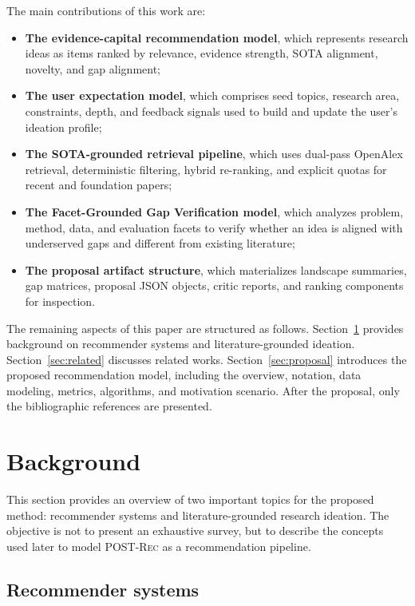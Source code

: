 \documentclass[preprint,12pt]{elsarticle}
\begin{document}
The main contributions of this work are:
\begin{itemize}
  \item \textbf{The evidence-capital recommendation model}, which represents research ideas as items ranked by relevance, evidence strength, SOTA alignment, novelty, and gap alignment;
  \item \textbf{The user expectation model}, which comprises seed topics, research area, constraints, depth, and feedback signals used to build and update the user's ideation profile;
  \item \textbf{The SOTA-grounded retrieval pipeline}, which uses dual-pass OpenAlex retrieval, deterministic filtering, hybrid re-ranking, and explicit quotas for recent and foundation papers;
  \item \textbf{The Facet-Grounded Gap Verification model}, which analyzes problem, method, data, and evaluation facets to verify whether an idea is aligned with underserved gaps and different from existing literature;
  \item \textbf{The proposal artifact structure}, which materializes landscape summaries, gap matrices, proposal JSON objects, critic reports, and ranking components for inspection.
\end{itemize}

The remaining aspects of this paper are structured as follows. Section~\ref{sec:background} provides background on recommender systems and literature-grounded ideation. Section~\ref{sec:related} discusses related works. Section~\ref{sec:proposal} introduces the proposed recommendation model, including the overview, notation, data modeling, metrics, algorithms, and motivation scenario. After the proposal, only the bibliographic references are presented.

\section{Background}
\label{sec:background}

This section provides an overview of two important topics for the proposed method: recommender systems and literature-grounded research ideation. The objective is not to present an exhaustive survey, but to describe the concepts used later to model \textsc{POST-Rec} as a recommendation pipeline.

\subsection{Recommender systems}
\end{document}
